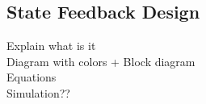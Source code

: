 \subsection{State Feedback Design}
Explain what is it\\
Diagram with colors + Block diagram\\
Equations\\
Simulation??\\